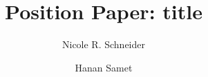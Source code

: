 \documentclass[sigconf]{style/acmart}
\begin{document}


\graphicspath{ {figures/}{auto_commit_fig/}{auto_fig/} }

\newcommand{\latexfile}[1]{}

\newcommand{\pinaforecomment}[4]{\colorbox{#1}{\textcolor{#4}{\parbox{.8\linewidth}{#2: #3}}}}
\newcommand{\osullikomment}[1]{\pinaforecomment{green}{Kent}{#1}{black}}
\newcommand{\nrscomment}[1]{\pinaforecomment{violet}{Nicole}{#1}{white}}

\newcommand\blankpage{%
    \null
    \thispagestyle{empty}%
    \addtocounter{page}{-1}%
    \newpage}

%



\title{Position Paper: title\\}

\author{Nicole R. Schneider}


\author{Hanan Samet}



\begin{abstract}
\latexfile{00_Abstract.tex}
\end{abstract}

\maketitle
\end{document}
